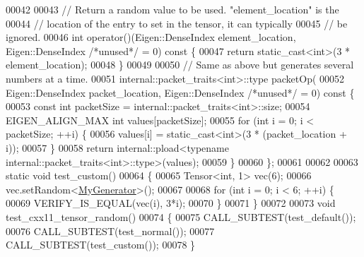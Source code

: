 \begin{DoxyCode}
00042 
00043   \textcolor{comment}{// Return a random value to be used.  "element\_location" is the}
00044   \textcolor{comment}{// location of the entry to set in the tensor, it can typically}
00045   \textcolor{comment}{// be ignored.}
00046   \textcolor{keywordtype}{int} operator()(Eigen::DenseIndex element\_location, Eigen::DenseIndex \textcolor{comment}{/*unused*/} = 0)\textcolor{keyword}{ const }\{
00047     \textcolor{keywordflow}{return} \textcolor{keyword}{static\_cast<}\textcolor{keywordtype}{int}\textcolor{keyword}{>}(3 * element\_location);
00048   \}
00049 
00050   \textcolor{comment}{// Same as above but generates several numbers at a time.}
00051   internal::packet\_traits<int>::type packetOp(
00052       Eigen::DenseIndex packet\_location, Eigen::DenseIndex \textcolor{comment}{/*unused*/} = 0)\textcolor{keyword}{ const }\{
00053     \textcolor{keyword}{const} \textcolor{keywordtype}{int} packetSize = internal::packet\_traits<int>::size;
00054     EIGEN\_ALIGN\_MAX \textcolor{keywordtype}{int} values[packetSize];
00055     \textcolor{keywordflow}{for} (\textcolor{keywordtype}{int} i = 0; i < packetSize; ++i) \{
00056       values[i] = \textcolor{keyword}{static\_cast<}\textcolor{keywordtype}{int}\textcolor{keyword}{>}(3 * (packet\_location + i));
00057     \}
00058     \textcolor{keywordflow}{return} internal::pload<typename internal::packet\_traits<int>::type>(values);
00059   \}
00060 \};
00061 
00062 
00063 \textcolor{keyword}{static} \textcolor{keywordtype}{void} test\_custom()
00064 \{
00065   Tensor<int, 1> vec(6);
00066   vec.setRandom<\hyperlink{struct_my_generator}{MyGenerator}>();
00067 
00068   \textcolor{keywordflow}{for} (\textcolor{keywordtype}{int} i = 0; i < 6; ++i) \{
00069     VERIFY\_IS\_EQUAL(vec(i), 3*i);
00070   \}
00071 \}
00072 
00073 \textcolor{keywordtype}{void} test\_cxx11\_tensor\_random()
00074 \{
00075   CALL\_SUBTEST(test\_default());
00076   CALL\_SUBTEST(test\_normal());
00077   CALL\_SUBTEST(test\_custom());
00078 \}
\end{DoxyCode}
